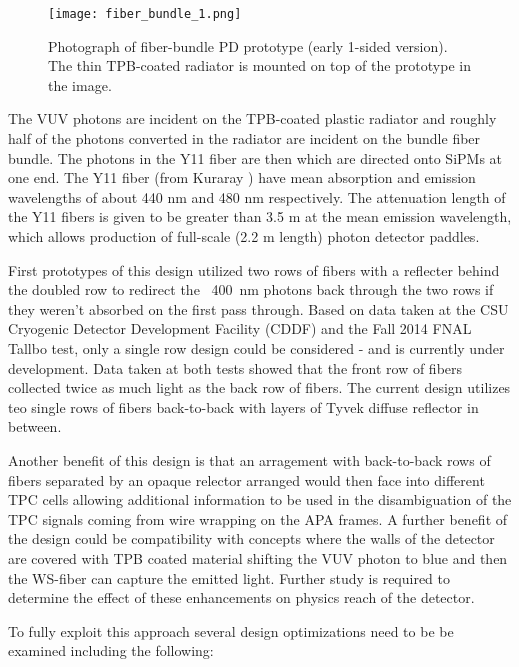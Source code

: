 \begin{figure}[h!]
  \centering
  \texttt{[image: fiber\_bundle\_1.png]}
\caption{Photograph of fiber-bundle PD prototype (early 1-sided
  version). The thin TPB-coated radiator is mounted on top of the
  prototype in the image.}
\label{fiber_bundle}
\end{figure}

The VUV photons are incident on the TPB-coated plastic radiator and
roughly half of the photons converted in the radiator are incident on
the bundle fiber bundle. The photons in the Y11 fiber are then which
are directed onto SiPMs at one end. The Y11 fiber (from Kuraray ) have
mean absorption and emission wavelengths of about 440 nm and 480 nm
respectively.  The attenuation length of the Y11 fibers is given to be
greater than 3.5 m at the mean emission wavelength, which allows
production of full-scale (2.2 m length) photon detector paddles.

First prototypes of this design utilized two rows of fibers with a
reflecter behind the doubled row to redirect the ~400~nm photons back
through the two rows if they weren't absorbed on the first pass
through. Based on data taken at the CSU Cryogenic Detector Development
Facility (CDDF) and the Fall 2014 FNAL Tallbo test, only a single row
design could be considered - and is currently under development. Data
taken at both tests showed that the front row of fibers collected
twice as much light as the back row of fibers. The current design
utilizes teo single rows of fibers back-to-back with layers of Tyvek
diffuse reflector in between.

Another benefit of this design is that an arragement with back-to-back
rows of fibers separated by an opaque relector arranged would then
face into different TPC cells allowing additional information to be
used in the disambiguation of the TPC signals coming from wire
wrapping on the APA frames. A further benefit of the design could be
compatibility with concepts where the walls of the detector are
covered with TPB coated material shifting the VUV photon to blue and
then the WS-fiber can capture the emitted light. Further study is
required to determine the effect of these enhancements on physics
reach of the detector. 

To fully exploit this approach several design optimizations need to be
be examined including the following:

